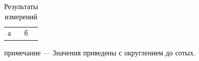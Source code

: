 \begin{table}
  \caption{Результаты измерений}
  \begin{tabular}{ll}
    а & б \\
  \end{tabular}
\end{table}

примечание — Значения приведены с округлением до сотых. %
